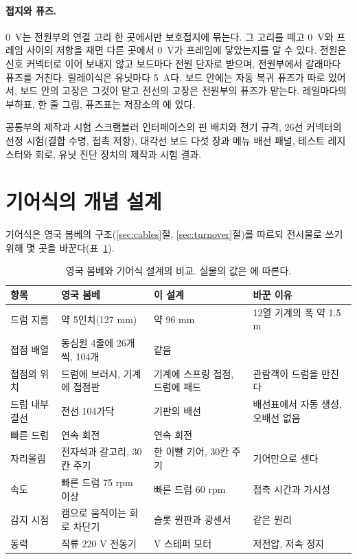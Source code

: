 \paragraph{접지와 퓨즈.} 0~V는 전원부의 연결 고리 한 곳에서만 보호접지에 묶는다. 그 고리를 떼고 0~V와 프레임
사이의 저항을 재면 다른 곳에서 0~V가 프레임에 닿았는지를 알 수 있다. 전원은 신호 커넥터로 이어 보내지 않고
보드마다 전원 단자로 받으며, 전원부에서 갈래마다 퓨즈를 거친다. 릴레이식은 유닛마다 5~A다. 보드 안에는 자동
복귀 퓨즈가 따로 있어서, 보드 안의 고장은 그것이 맡고 전선의 고장은 전원부의 퓨즈가 맡는다. 레일마다의 부하표,
한 줄 그림, 퓨즈표는 저장소의 에 있다.

\begin{todobox}{공통부의 제작과 시험}
스크램블러 인터페이스의 핀 배치와 전기 규격, 26선 커넥터의 선정 시험(결합 수명, 접촉 저항), 대각선 보드
다섯 장과 메뉴 배선 패널, 테스트 레지스터와  회로, 유닛 진단 장치의 제작과 시험 결과.
\end{todobox}

\section{기어식의 개념 설계}\label{sec:hw-gear}

기어식은 영국 봄베의 구조(\ref{sec:cables}절, \ref{sec:turnover}절)를 따르되 전시물로 쓰기 위해 몇 곳을
바꾼다(표~\ref{tab:hw-gear}).

\begin{table}[ht]
\centering
\caption{영국 봄베와 기어식 설계의 비교. 실물의 값은 \cite{us6812report1944,ellsbury1998bombe,jackson-bh11}에
따른다.}
\label{tab:hw-gear}
\small
\begin{tabularx}{\linewidth}{>{\raggedright\arraybackslash}p{20mm}>{\raggedright\arraybackslash}p{38mm}>{\raggedright\arraybackslash}p{36mm}>{\raggedright\arraybackslash}X}
\toprule
항목 & 영국 봄베 & 이 설계 & 바꾼 이유 \\
\midrule
드럼 지름 & 약 5인치(127 mm) & 약 96 mm & 12열 기계의 폭 약 1.5 m \\
접점 배열 & 동심원 4줄에 26개씩, 104개 & 같음 & \\
접점의 위치 & 드럼에 브러시, 기계에 접점판 & 기계에 스프링 접점, 드럼에 패드 & 관람객이 드럼을 만진다 \\
드럼 내부 결선 & 전선 104가닥 & 기판의 배선 & 배선표에서 자동 생성, 오배선 없음 \\
빠른 드럼 & 연속 회전 & 연속 회전 & \\
자리올림 & 전자석과 갈고리, 30칸 주기 & 한 이빨 기어, 30칸 주기 & 기어만으로 센다 \\
속도 & 빠른 드럼 75 rpm 이상 & 빠른 드럼 60 rpm & 접촉 시간과 가시성 \\
감지 시점 & 캠으로 움직이는 회로 차단기 & 슬롯 원판과 광센서 & 같은 원리 \\
동력 & 직류 220 V 전동기 & 48 V 스테퍼 모터 & 저전압, 저속 정지 \\
\bottomrule
\end{tabularx}
\end{table}

